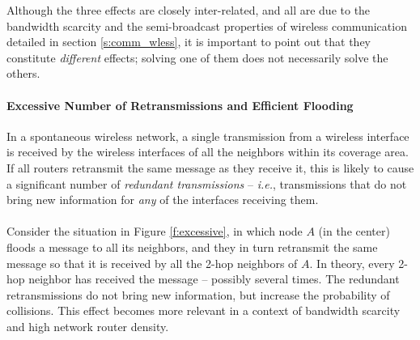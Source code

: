 \begin{remark}
Although the three effects are closely inter-related, and all are due to the bandwidth scarcity and the semi-broadcast properties of wireless communication detailed in section \ref{s:comm_wless}, it is important to point out that they constitute {\em different} effects; solving one of them does not necessarily solve the others. 
\end{remark}

\paragraph{Excessive Number of Retransmissions and Efficient Flooding}

In a spontaneous wireless network, a single transmission from a wireless interface is received by the wireless interfaces of all the neighbors within its coverage area. If all routers retransmit the same message as they receive it, this is likely to cause a significant number of {\em redundant transmissions} -- {\em i.e.}, transmissions that do not bring new information for {\em any} of the interfaces receiving them. \ \\ \ \\
%
Consider the situation in Figure \ref{f:excessive}, in which node $A$ (in the center) floods a message to all its neighbors, and they in turn retransmit the same message so that it is received by all the 2-hop neighbors of $A$. In theory, every 2-hop neighbor has received the message -- possibly several times. The redundant retransmissions do not bring new information, but increase the probability of collisions. This effect becomes more relevant in a context of bandwidth scarcity and high network router density. %

